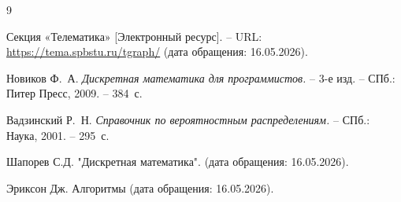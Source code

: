 \begin{thebibliography}{9}

Секция «Телематика» [Электронный ресурс]. --
URL: \url{https://tema.spbstu.ru/tgraph/} (дата обращения: 16.05.2026).

Новиков Ф.~А. \textit{Дискретная математика для программистов.} --
3-е изд. -- СПб.: Питер Пресс, 2009. -- 384~с.

Вадзинский Р.~Н. \textit{Справочник по вероятностным распределениям.} --
СПб.: Наука, 2001. -- 295~с.

Шапорев С.Д. "Дискретная математика".
(дата обращения: 16.05.2026).

Эриксон Дж. Алгоритмы
(дата обращения: 16.05.2026).

\end{thebibliography}
